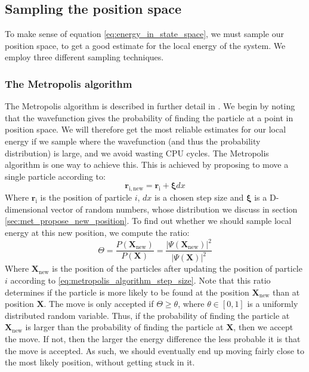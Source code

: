 \documentclass[a4paper, 10pt]{article}
\begin{document}
	\subsection{Sampling the position space}
	To make sense of equation \ref{eq:energy_in_state_space}, we must sample our position space, to get a good estimate for the local energy of the system. We employ three different sampling techniques.	
	\subsubsection{The Metropolis algorithm}
	The Metropolis algorithm is described in further detail in \cite{Hjorth-Jensen2015}. We begin by noting that the wavefunction gives the probability of finding the particle at a point in position space. We will therefore get the most reliable estimates for our local energy if we sample where the wavefunction (and thus the probability distribution) is large, and we avoid wasting CPU cycles. The Metropolis algorithm is one way to achieve this. This is achieved by proposing to move a single particle according to:
	\begin{equation}\label{eq:metropolis_algorithm_step_size}
	\boldsymbol{r}_{\mathrm{i,new}}=\boldsymbol{r}_{\mathrm{i}}+\boldsymbol{\xi}dx
	\end{equation}
	Where $\boldsymbol{r}_{\mathrm{i}}$ is the position of particle $i$, $dx$ is a chosen step size and $\boldsymbol{\xi}$ is a D-dimensional vector of random numbers, whose distribution we discuss in section \ref{sec:met_propose_new_position}. To find out whether we should sample local energy at this new position, we compute the ratio:
	\begin{equation}\label{eq:transition_probability}
	\Theta=\frac{P(\boldsymbol{X}_{\mathrm{new}})}{P(\boldsymbol{X})}=\frac{|\Psi(\boldsymbol{X}_{\mathrm{new}})|^2}{|\Psi(\boldsymbol{X})|^2}
	\end{equation}
	Where $\boldsymbol{X}_{\mathrm{new}}$ is the position of the particles after updating the position of particle $i$ according to \ref{eq:metropolis_algorithm_step_size}. Note that this ratio determines if the particle is more likely to be found at the position $\boldsymbol{X}_{\mathrm{new}}$ than at position $\boldsymbol{X}$. The move is only accepted if $\Theta \geq \theta$, where $\theta\in[0,1]$ is a uniformly distributed random variable. Thus, if the probability of finding the particle at $\mathbf{X}_{\mathrm{new}}$ is larger than the probability of finding the particle at $\mathbf{X}$, then we accept the move. If not, then the larger the energy difference the less probable it is that the move is accepted. As such, we should eventually end up moving fairly close to the most likely position, without getting stuck in it.
\end{document}

